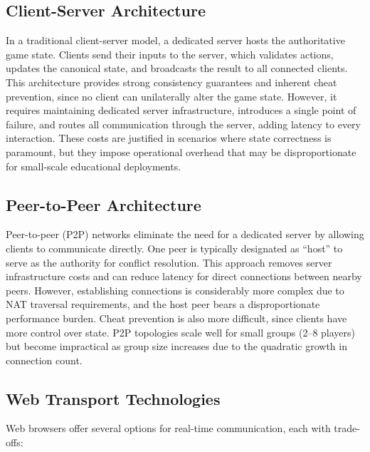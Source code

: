 \subsection{Client-Server Architecture}
\label{subsec:client-server}

In a traditional client-server model, a dedicated server hosts the authoritative game state. Clients send their inputs to the server, which validates actions, updates the canonical state, and broadcasts the result to all connected clients. This architecture provides strong consistency guarantees and inherent cheat prevention, since no client can unilaterally alter the game state. However, it requires maintaining dedicated server infrastructure, introduces a single point of failure, and routes all communication through the server, adding latency to every interaction. These costs are justified in scenarios where state correctness is paramount, but they impose operational overhead that may be disproportionate for small-scale educational deployments.

\subsection{Peer-to-Peer Architecture}
\label{subsec:p2p}

Peer-to-peer (P2P) networks eliminate the need for a dedicated server by allowing clients to communicate directly. One peer is typically designated as ``host'' to serve as the authority for conflict resolution. This approach removes server infrastructure costs and can reduce latency for direct connections between nearby peers. However, establishing connections is considerably more complex due to NAT traversal requirements, and the host peer bears a disproportionate performance burden. Cheat prevention is also more difficult, since clients have more control over state. P2P topologies scale well for small groups (2--8 players) but become impractical as group size increases due to the quadratic growth in connection count.

\subsection{Web Transport Technologies}
\label{subsec:web-transport}

Web browsers offer several options for real-time communication, each with trade-offs:


